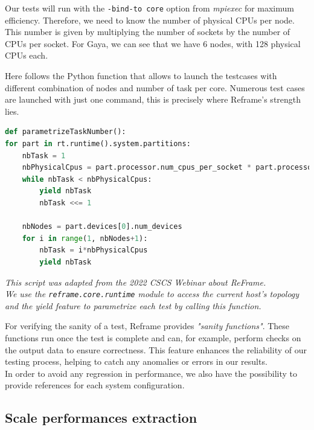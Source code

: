 \documentclass[12pt]{article}
\begin{document}
Our tests will run with the \texttt{-bind-to core} option from \textit{mpiexec} for maximum efficiency.
Therefore, we need to know the number of physical CPUs per node. This number is given by multiplying the number of sockets by the number of CPUs per socket.
For Gaya, we can see that we have 6 nodes, with 128 physical CPUs each.

Here follows the Python function that allows to launch the testcases with different combination of nodes and number of task per core.
Numerous test cases are launched with just one command, this is precisely where Reframe's strength lies. \\

\begin{scriptsize}
\begin{lstlisting}[language=python,caption={Task number parametrization}]
def parametrizeTaskNumber():
for part in rt.runtime().system.partitions:
    nbTask = 1
    nbPhysicalCpus = part.processor.num_cpus_per_socket * part.processor.num_sockets
    while nbTask < nbPhysicalCpus:
        yield nbTask
        nbTask <<= 1

    nbNodes = part.devices[0].num_devices
    for i in range(1, nbNodes+1):
        nbTask = i*nbPhysicalCpus
        yield nbTask
\end{lstlisting}
\end{scriptsize}

\textit{This script was adapted from the 2022 CSCS Webinar \cite{CSCS} about ReFrame. \\
        We use the \texttt{reframe.core.runtime} module to access the current host's topology and the yield feature to parametrize each test by calling this function.}



For verifying the sanity of a test, Reframe provides \textit{"sanity functions"}. These functions run once the test is complete and can, for example, perform checks on the output data to ensure correctness. 
This feature enhances the reliability of our testing process, helping to catch any anomalies or errors in our results. \\
In order to avoid any regression in performance, we also have the possibility to provide references for each system configuration.


\subsection{Scale performances extraction}
\end{document}
